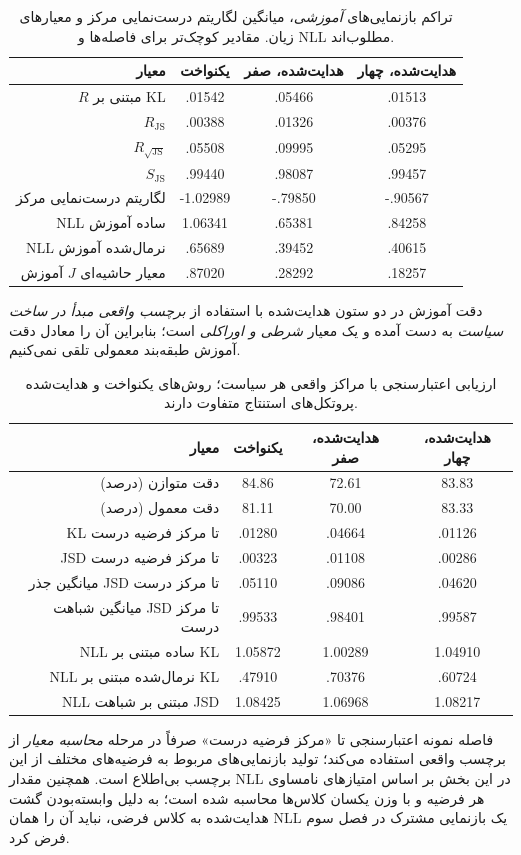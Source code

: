 \begin{table}[htbp]
\centering\small
\caption{تراکم بازنمایی‌های \emph{آموزشی}، میانگین لگاریتم درست‌نمایی مرکز و معیارهای زیان. مقادیر کوچک‌تر برای فاصله‌ها و NLL مطلوب‌اند.}
\label{tab:ch4-center-observation-within}
\begin{tabular}{rccc}\hline
معیار & یکنواخت & هدایت‌شده، صفر & هدایت‌شده، چهار\\\hline
$R$ مبتنی بر KL & .01542 & .05466 & .01513\\
$R_{\mathrm{JS}}$ & .00388 & .01326 & .00376\\
$R_{\sqrt{\mathrm{JS}}}$ & .05508 & .09995 & .05295\\
$S_{\mathrm{JS}}$ & .99440 & .98087 & .99457\\
لگاریتم درست‌نمایی مرکز & -1.02989 & -.79850 & -.90567\\
NLL ساده آموزش & 1.06341 & .65381 & .84258\\
NLL نرمال‌شده آموزش & .65689 & .39452 & .40615\\
معیار حاشیه‌ای $J$ آموزش & .87020 & .28292 & .18257\\\hline
\end{tabular}
\end{table}
دقت آموزش در دو ستون هدایت‌شده با استفاده از \emph{برچسب واقعی مبدأ در ساخت سیاست} به دست آمده و یک معیار \emph{شرطی و اوراکلی} است؛ بنابراین آن را معادل دقت آموزش طبقه‌بند معمولی تلقی نمی‌کنیم.

\begin{table}[htbp]
\centering\small
\caption{ارزیابی اعتبارسنجی با مراکز واقعی هر سیاست؛ روش‌های یکنواخت و هدایت‌شده پروتکل‌های استنتاج متفاوت دارند.}
\label{tab:ch4-center-observation-validation}
\begin{tabular}{rccc}\hline
معیار & یکنواخت & هدایت‌شده، صفر & هدایت‌شده، چهار\\\hline
دقت متوازن (درصد) & 84.86 & 72.61 & 83.83\\
دقت معمول (درصد) & 81.11 & 70.00 & 83.33\\
KL تا مرکز فرضیه درست & .01280 & .04664 & .01126\\
JSD تا مرکز فرضیه درست & .00323 & .01108 & .00286\\
میانگین جذر JSD تا مرکز درست & .05110 & .09086 & .04620\\
میانگین شباهت JSD تا مرکز درست & .99533 & .98401 & .99587\\
NLL ساده مبتنی بر KL & 1.05872 & 1.00289 & 1.04910\\
NLL نرمال‌شده مبتنی بر KL & .47910 & .70376 & .60724\\
NLL مبتنی بر شباهت JSD & 1.08425 & 1.06968 & 1.08217\\\hline
\end{tabular}
\end{table}
فاصله نمونه اعتبارسنجی تا «مرکز فرضیه درست» صرفاً در مرحله \emph{محاسبه معیار} از برچسب واقعی استفاده می‌کند؛ تولید بازنمایی‌های مربوط به فرضیه‌های مختلف از این برچسب بی‌اطلاع است. همچنین مقدار NLL در این بخش بر اساس امتیازهای نامساوی هر فرضیه و با وزن یکسان کلاس‌ها محاسبه شده است؛ به دلیل وابسته‌بودن گشت هدایت‌شده به کلاس فرضی، نباید آن را همان NLL یک بازنمایی مشترک در فصل سوم فرض کرد.

